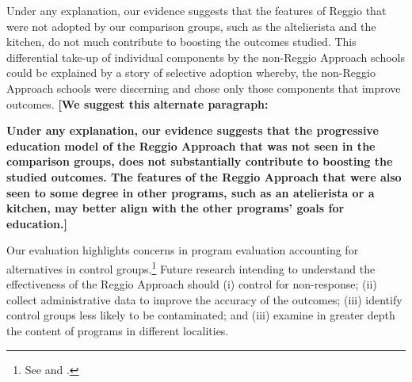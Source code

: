 Under any explanation, our evidence suggests that the features of Reggio that were not adopted by our comparison groups, such as the altelierista and the kitchen, do not much contribute to boosting the outcomes studied. This differential take-up of individual components by the non-Reggio Approach schools could be explained by a story of selective adoption whereby, the non-Reggio Approach schools were discerning and chose only those components that improve outcomes.
\textbf{[We suggest this alternate paragraph:} 

\textbf{Under any explanation, our evidence suggests that the progressive education model of the Reggio Approach that was not seen in the comparison groups, does not substantially contribute to boosting the studied outcomes. The features of the Reggio Approach that were also seen to some degree in other programs, such as an atelierista or a kitchen, may better align with the other programs' goals for education.]}

Our evaluation highlights concerns in program evaluation accounting for alternatives in control groups.\footnote{See \cite{Heckman_Hohmann_etal_2000_QJE} and \cite{Kline_Walters_2016_QJE}.} Future research intending to understand the effectiveness of the Reggio Approach should (i) control for non-response; (ii) collect administrative data to improve the accuracy of the outcomes; (iii) identify control groups less likely to be contaminated; and (iii) examine in greater depth the content of programs in different localities.




